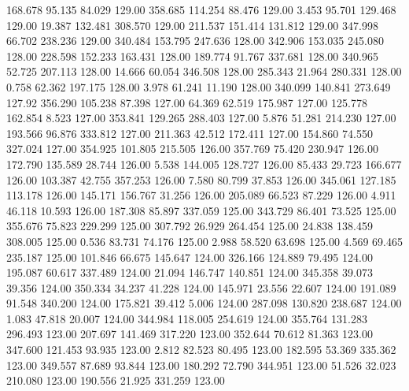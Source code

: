  168.678   95.135   84.029       129.00
 358.685  114.254   88.476       129.00
   3.453   95.701  129.468       129.00
  19.387  132.481  308.570       129.00
 211.537  151.414  131.812       129.00
 347.998   66.702  238.236       129.00
 340.484  153.795  247.636       128.00
 342.906  153.035  245.080       128.00
 228.598  152.233  163.431       128.00
 189.774   91.767  337.681       128.00
 340.965   52.725  207.113       128.00
  14.666   60.054  346.508       128.00
 285.343   21.964  280.331       128.00
   0.758   62.362  197.175       128.00
   3.978   61.241   11.190       128.00
 340.099  140.841  273.649       127.92
 356.290  105.238   87.398       127.00
  64.369   62.519  175.987       127.00
 125.778  162.854    8.523       127.00
 353.841  129.265  288.403       127.00
   5.876   51.281  214.230       127.00
 193.566   96.876  333.812       127.00
 211.363   42.512  172.411       127.00
 154.860   74.550  327.024       127.00
 354.925  101.805  215.505       126.00
 357.769   75.420  230.947       126.00
 172.790  135.589   28.744       126.00
   5.538  144.005  128.727       126.00
  85.433   29.723  166.677       126.00
 103.387   42.755  357.253       126.00
   7.580   80.799   37.853       126.00
 345.061  127.185  113.178       126.00
 145.171  156.767   31.256       126.00
 205.089   66.523   87.229       126.00
   4.911   46.118   10.593       126.00
 187.308   85.897  337.059       125.00
 343.729   86.401   73.525       125.00
 355.676   75.823  229.299       125.00
 307.792   26.929  264.454       125.00
  24.838  138.459  308.005       125.00
   0.536   83.731   74.176       125.00
   2.988   58.520   63.698       125.00
   4.569   69.465  235.187       125.00
 101.846   66.675  145.647       124.00
 326.166  124.889   79.495       124.00
 195.087   60.617  337.489       124.00
  21.094  146.747  140.851       124.00
 345.358   39.073   39.356       124.00
 350.334   34.237   41.228       124.00
 145.971   23.556   22.607       124.00
 191.089   91.548  340.200       124.00
 175.821   39.412    5.006       124.00
 287.098  130.820  238.687       124.00
   1.083   47.818   20.007       124.00
 344.984  118.005  254.619       124.00
 355.764  131.283  296.493       123.00
 207.697  141.469  317.220       123.00
 352.644   70.612   81.363       123.00
 347.600  121.453   93.935       123.00
   2.812   82.523   80.495       123.00
 182.595   53.369  335.362       123.00
 349.557   87.689   93.844       123.00
 180.292   72.790  344.951       123.00
  51.526   32.023  210.080       123.00
 190.556   21.925  331.259       123.00
